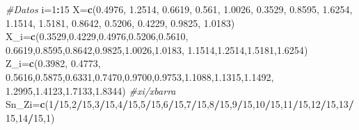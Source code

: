 \documentclass[a4paper,oneside,openany]{book}
\newenvironment{Shaded}{\begin{snugshade}}{\end{snugshade}}
\newcommand{\KeywordTok}[1]{\textcolor[rgb]{0.13,0.29,0.53}{\textbf{#1}}}
\newcommand{\DecValTok}[1]{\textcolor[rgb]{0.00,0.00,0.81}{#1}}
\newcommand{\FloatTok}[1]{\textcolor[rgb]{0.00,0.00,0.81}{#1}}
\newcommand{\CommentTok}[1]{\textcolor[rgb]{0.56,0.35,0.01}{\textit{#1}}}
\newcommand{\OperatorTok}[1]{\textcolor[rgb]{0.81,0.36,0.00}{\textbf{#1}}}
\newcommand{\NormalTok}[1]{#1}
\begin{document}
\begin{Shaded}
\begin{Highlighting}[]
\CommentTok{#Datos}
\NormalTok{i=}\DecValTok{1}\OperatorTok{:}\DecValTok{15}
\NormalTok{X=}\KeywordTok{c}\NormalTok{(}\FloatTok{0.4976}\NormalTok{, }\FloatTok{1.2514}\NormalTok{, }\FloatTok{0.6619}\NormalTok{, }\FloatTok{0.561}\NormalTok{, }\FloatTok{1.0026}\NormalTok{, }\FloatTok{0.3529}\NormalTok{, }\FloatTok{0.8595}\NormalTok{, }\FloatTok{1.6254}\NormalTok{,}
                             \FloatTok{1.1514}\NormalTok{, }\FloatTok{1.5181}\NormalTok{, }\FloatTok{0.8642}\NormalTok{, }\FloatTok{0.5206}\NormalTok{, }\FloatTok{0.4229}\NormalTok{, }\FloatTok{0.9825}\NormalTok{, }\FloatTok{1.0183}\NormalTok{)}
\NormalTok{X_i=}\KeywordTok{c}\NormalTok{(}\FloatTok{0.3529}\NormalTok{,}\FloatTok{0.4229}\NormalTok{,}\FloatTok{0.4976}\NormalTok{,}\FloatTok{0.5206}\NormalTok{,}\FloatTok{0.5610}\NormalTok{, }\FloatTok{0.6619}\NormalTok{,}\FloatTok{0.8595}\NormalTok{,}\FloatTok{0.8642}\NormalTok{,}\FloatTok{0.9825}\NormalTok{,}\FloatTok{1.0026}\NormalTok{,}\FloatTok{1.0183}\NormalTok{,}
      \FloatTok{1.1514}\NormalTok{,}\FloatTok{1.2514}\NormalTok{,}\FloatTok{1.5181}\NormalTok{,}\FloatTok{1.6254}\NormalTok{)}
\NormalTok{Z_i=}\KeywordTok{c}\NormalTok{(}\FloatTok{0.3982}\NormalTok{, }\FloatTok{0.4773}\NormalTok{, }\FloatTok{0.5616}\NormalTok{,}\FloatTok{0.5875}\NormalTok{,}\FloatTok{0.6331}\NormalTok{,}\FloatTok{0.7470}\NormalTok{,}\FloatTok{0.9700}\NormalTok{,}\FloatTok{0.9753}\NormalTok{,}\FloatTok{1.1088}\NormalTok{,}\FloatTok{1.1315}\NormalTok{,}\FloatTok{1.1492}\NormalTok{,}
      \FloatTok{1.2995}\NormalTok{,}\FloatTok{1.4123}\NormalTok{,}\FloatTok{1.7133}\NormalTok{,}\FloatTok{1.8344}\NormalTok{)   }\CommentTok{#xi/xbarra}
\NormalTok{Sn_Zi=}\KeywordTok{c}\NormalTok{(}\DecValTok{1}\OperatorTok{/}\DecValTok{15}\NormalTok{,}\DecValTok{2}\OperatorTok{/}\DecValTok{15}\NormalTok{,}\DecValTok{3}\OperatorTok{/}\DecValTok{15}\NormalTok{,}\DecValTok{4}\OperatorTok{/}\DecValTok{15}\NormalTok{,}\DecValTok{5}\OperatorTok{/}\DecValTok{15}\NormalTok{,}\DecValTok{6}\OperatorTok{/}\DecValTok{15}\NormalTok{,}\DecValTok{7}\OperatorTok{/}\DecValTok{15}\NormalTok{,}\DecValTok{8}\OperatorTok{/}\DecValTok{15}\NormalTok{,}\DecValTok{9}\OperatorTok{/}\DecValTok{15}\NormalTok{,}\DecValTok{10}\OperatorTok{/}\DecValTok{15}\NormalTok{,}\DecValTok{11}\OperatorTok{/}\DecValTok{15}\NormalTok{,}\DecValTok{12}\OperatorTok{/}\DecValTok{15}\NormalTok{,}\DecValTok{13}\OperatorTok{/}\DecValTok{15}\NormalTok{,}\DecValTok{14}\OperatorTok{/}\DecValTok{15}\NormalTok{,}\DecValTok{1}\NormalTok{)}

\end{Highlighting}
\end{Shaded}
\end{document}

